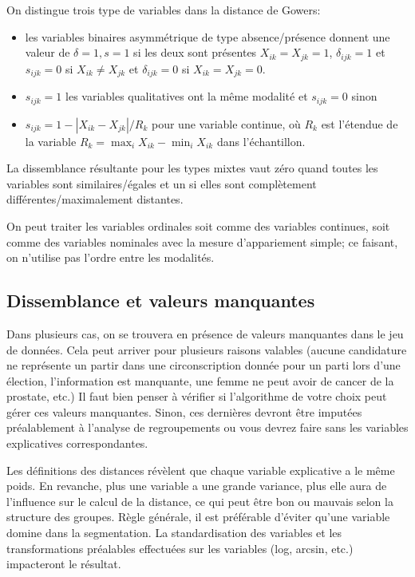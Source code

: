 \documentclass[
  11pt,
  letterpaper,
]{book}
\providecommand{\tightlist}{%
  \setlength{\itemsep}{0pt}\setlength{\parskip}{0pt}}\usepackage{longtable,booktabs,array}
\theoremstyle{definition}
\theoremstyle{remark}
\begin{document}
On distingue trois type de variables dans la distance de Gowers:

\begin{itemize}
\tightlist
\item
  les variables binaires asymmétrique de type absence/présence donnent
  une valeur de \(\delta=1, s=1\) si les deux sont présentes
  \(X_{ik}=X_{jk}=1\), \(\delta_{ijk}=1\) et \(s_{ijk}=0\) si
  \(X_{ik} \neq X_{jk}\) et \(\delta_{ijk}=0\) si \(X_{ik}=X_{jk}=0\).
\item
  \(s_{ijk}=1\) les variables qualitatives ont la même modalité et
  \(s_{ijk}=0\) sinon
\item
  \(s_{ijk} = 1-|X_{ik}-X_{jk}|/R_k\) pour une variable continue, où
  \(R_k\) est l'étendue de la variable
  \(R_k=\max_{i} X_{ik} - \min_i X_{ik}\) dans l'échantillon.
\end{itemize}

La dissemblance résultante pour les types mixtes vaut zéro quand toutes
les variables sont similaires/égales et un si elles sont complètement
différentes/maximalement distantes.

On peut traiter les variables ordinales soit comme des variables
continues, soit comme des variables nominales avec la mesure
d'appariement simple; ce faisant, on n'utilise pas l'ordre entre les
modalités.

\hypertarget{dissemblance-et-valeurs-manquantes}{%
\subsection{Dissemblance et valeurs
manquantes}\label{dissemblance-et-valeurs-manquantes}}

Dans plusieurs cas, on se trouvera en présence de valeurs manquantes
dans le jeu de données. Cela peut arriver pour plusieurs raisons
valables (aucune candidature ne représente un partir dans une
circonscription donnée pour un parti lors d'une élection, l'information
est manquante, une femme ne peut avoir de cancer de la prostate, etc.)
Il faut bien penser à vérifier si l'algorithme de votre choix peut gérer
ces valeurs manquantes. Sinon, ces dernières devront être imputées
préalablement à l'analyse de regroupements ou vous devrez faire sans les
variables explicatives correspondantes.

Les définitions des distances révèlent que chaque variable explicative a
le même poids. En revanche, plus une variable a une grande variance,
plus elle aura de l'influence sur le calcul de la distance, ce qui peut
être bon ou mauvais selon la structure des groupes. Règle générale, il
est préférable d'éviter qu'une variable domine dans la segmentation. La
standardisation des variables et les transformations préalables
effectuées sur les variables (log, arcsin, etc.) impacteront le
résultat.
\end{document}
